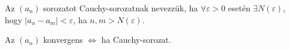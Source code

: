 
\begin{definition}
  Az $(a_n)$ sorozatot Cauchy-sorozatnak nevezzük, ha $\forall \varepsilon > 0$
  esetén $\exists N(\varepsilon)$, hogy $|a_n - a_m| < \varepsilon$, ha $n, m >
    N(\varepsilon)$.
\end{definition}

\begin{theorem}
  Az $(a_n)$ konvergens $\Leftrightarrow$ ha Cauchy-sorozat.
\end{theorem}
